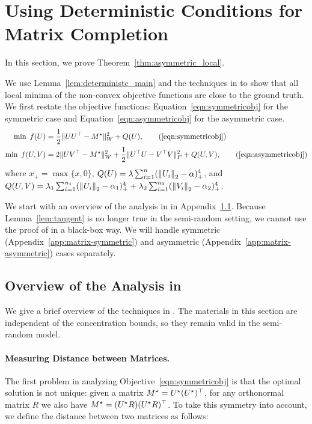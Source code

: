 
\section{Using Deterministic Conditions for Matrix Completion}
\label{app:matrix}
In this section, we prove Theorem~\ref{thm:asymmetric_local}.

We use Lemma~\ref{lem:deterministc_main} and the techniques in \citep{GeJZ17} to show that all local minima of the non-convex objective functions are close to the ground truth.
We first restate the objective functions: Equation~\eqref{eqn:symmetricobj} for the symmetric case and Equation~\eqref{eqn:asymmetricobj} for the asymmetric case.
\begin{align*}
\min \; f(U) &= \frac{1}{2}\|UU^\top - \Ms\|_W^2 + Q(U),  \tag{\ref{eqn:symmetricobj}} \\
\min \; f(U, V) &= 2\|UV^\top - \Ms\|_W^2 + \frac{1}{2} \|U^\top U-V^\top V\|_F^2 + Q(U,V), \tag{\ref{eqn:asymmetricobj}}
\end{align*}
where $x_+ = \max\{x,0\}$, $Q(U) = \lambda \sum_{i=1}^n ({\lVert U_i{\rVert}}_2 - \alpha)_+^4$, and $Q(U,V) = \lambda_1 \sum_{i=1}^{n_1} ({\lVert U_i{\rVert}}_2 - \alpha_1)_+^4 +\lambda_2\sum_{i=1}^{n_2} ({\lVert V_i{\rVert}}_2 - \alpha_2)_+^4$.

We start with an overview of the analysis in \citep{GeJZ17} in Appendix~\ref{app:matrix-overview}.
Because Lemma~\ref{lem:tangent} is no longer true in the semi-random setting, we cannot use the proof of \cite{GeJZ17} in a black-box way.
We will handle symmetric (Appendix~\ref{app:matrix-symmetric}) and asymmetric (Appendix~\ref{app:matrix-asymmetric}) cases separately.

\subsection{Overview of the Analysis in \citep{GeJZ17}}
\label{app:matrix-overview}

We give a brief overview of the techniques in \citep{GeJZ17}. The materials in this section are independent of the concentration bounds, so they remain valid in the semi-random model.

\paragraph{Measuring Distance between Matrices.} The first problem in analyzing Objective~\eqref{eqn:symmetricobj} is that the optimal solution is not unique: given a matrix $M^\star = U^\star(U^\star)^\top$, for any orthonormal matrix $R$ we also have $M^\star = (U^\star R)(U^\star R)^\top$. To take this symmetry into account, we define the distance between two matrices as follows:

